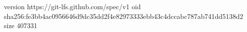 version https://git-lfs.github.com/spec/v1
oid sha256:fe3bb4ac0956646d9dc35dd2f4e82973333ebb43c4dccabc787ab741dd5138d2
size 407331
